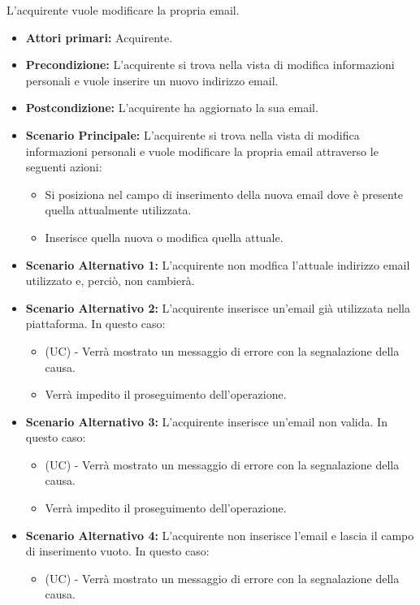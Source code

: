 L'acquirente vuole modificare la propria email.
\begin{itemize}
    \item \textbf{Attori primari:} Acquirente.
    \item \textbf{Precondizione:} L'acquirente si trova nella vista di modifica informazioni personali e vuole inserire un nuovo indirizzo email.
    \item \textbf{Postcondizione:} L'acquirente ha aggiornato la sua email.
    \item \textbf{Scenario Principale:} L'acquirente si trova nella vista di modifica informazioni personali e vuole modificare la propria email attraverso le seguenti azioni:
        \begin{itemize}
            \item Si posiziona nel campo di inserimento della nuova email dove è presente quella attualmente utilizzata.
            \item Inserisce quella nuova o modifica quella attuale.
        \end{itemize}
    \item \textbf{Scenario Alternativo 1:} L'acquirente non modfica l'attuale indirizzo email utilizzato e, perciò, non cambierà.
    \item \textbf{Scenario Alternativo 2:} L'acquirente inserisce un'email già utilizzata nella piattaforma. In questo caso:
    \begin{itemize}
        \item (UC) - Verrà mostrato un messaggio di errore con la segnalazione della causa.
        \item Verrà impedito il proseguimento dell'operazione.
    \end{itemize}
    \item \textbf{Scenario Alternativo 3:} L'acquirente inserisce un'email non valida. In questo caso:
    \begin{itemize}
        \item (UC) - Verrà mostrato un messaggio di errore con la segnalazione della causa.
        \item Verrà impedito il proseguimento dell'operazione.
    \end{itemize}
    \item \textbf{Scenario Alternativo 4:} L'acquirente non inserisce l'email e lascia il campo di inserimento vuoto. In questo caso:
    \begin{itemize}
        \item (UC) - Verrà mostrato un messaggio di errore con la segnalazione della causa.

\end{itemize}
\end{itemize}
